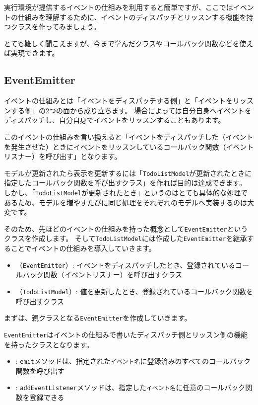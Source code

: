 実行環境が提供するイベントの仕組みを利用すると簡単ですが、ここではイベントの仕組みを理解するために、イベントのディスパッチとリッスンする機能を持つクラスを作ってみましょう。

とても難しく聞こえますが、今まで学んだクラスやコールバック関数などを使えば実現できます。

\hypertarget{event-emitter}{%
\subsection{EventEmitter}\label{event-emitter}}

イベントの仕組みとは「イベントをディスパッチする側」と「イベントをリッスンする側」の2つの面から成り立ちます。
場合によっては自分自身へイベントをディスパッチし、自分自身でイベントをリッスンすることもあります。

このイベントの仕組みを言い換えると「イベントをディスパッチした（イベントを発生させた）ときにイベントをリッスンしているコールバック関数（イベントリスナー）を呼び出す」となります。

モデルが更新されたら表示を更新するには「\texttt{TodoListModel}が更新されたときに指定したコールバック関数を呼び出すクラス」を作れば目的は達成できます。
しかし、「\texttt{TodoListModel}が更新されたとき」というのはとても具体的な処理であるため、モデルを増やすたびに同じ処理をそれぞれのモデルへ実装するのは大変です。

そのため、先ほどのイベントの仕組みを持った概念として\texttt{EventEmitter}というクラスを作成します。
そして\texttt{TodoListModel}には作成した\texttt{EventEmitter}を継承することでイベントの仕組みを導入していきます。

\begin{itemize}
\item
  （\texttt{EventEmitter}）: 
  イベントをディスパッチしたとき、登録されているコールバック関数（イベントリスナー）を呼び出すクラス
\item
  （\texttt{TodoListModel}）: 
  値を更新したとき、登録されているコールバック関数を呼び出すクラス
\end{itemize}

まずは、親クラスとなる\texttt{EventEmitter}を作成していきます。

\texttt{EventEmitter}はイベントの仕組みで書いたディスパッチ側とリッスン側の機能を持ったクラスとなります。

\begin{itemize}
\item
  :
  \texttt{emit}メソッドは、指定された\texttt{イベント名}に登録済みのすべてのコールバック関数を呼び出す
\item
  :
  \texttt{addEventListener}メソッドは、指定した\texttt{イベント名}に任意のコールバック関数を登録できる
\end{itemize}

